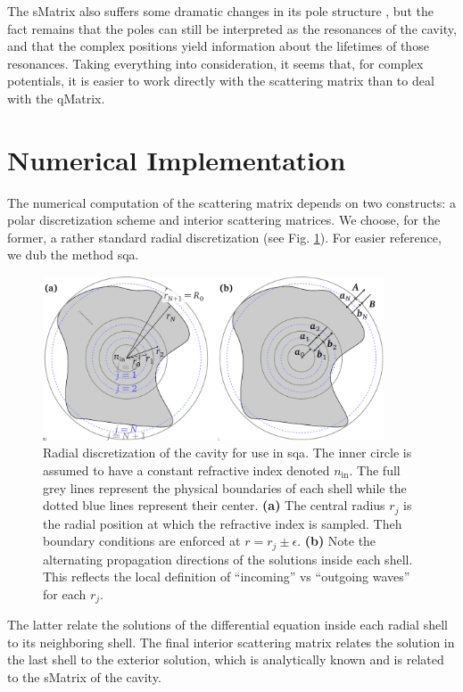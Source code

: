 The \gls{sMatrix} also suffers some dramatic changes in its pole structure
\cite{JOF1973,KOK1981}, but the fact remains that the poles can still be
interpreted as the resonances of the cavity, and that the complex positions
yield information about the lifetimes of those resonances. Taking everything
into consideration, it seems that, for complex potentials, it is easier to 
work directly with the scattering matrix than to deal with the \gls{qMatrix}.

\section{Numerical Implementation}
The numerical computation of the scattering matrix 
depends on two constructs: a polar discretization 
scheme and interior scattering matrices. We choose, for
the former, a rather standard radial discretization 
(see Fig. \ref{fig:passive.numerical.radialDiscretization}).
For easier reference, we dub the method \gls{sqa}.

\begin{figure}
 \centering
 \includegraphics[width=0.9\textwidth]{figs/passive/figDisScatCoeff.pdf}
 \caption[Radial discretization for use in SQA]
	 {Radial discretization of the cavity for use in \gls{sqa}. The inner circle is assumed to 
	 have a constant refractive index denoted $n_\text{in}$. The full grey lines represent
	 the physical boundaries of each shell while the dotted blue lines represent their
	 center. \textbf{(a)} The central radius $r_j$ is the radial position at which the 
	 refractive index is sampled. Theh boundary conditions are enforced at $r=r_j\pm\epsilon$.
	 \textbf{(b)} Note the alternating propagation directions of the solutions inside each shell.
	 This reflects the local definition of ``incoming'' vs ``outgoing waves'' for each $r_j$.}
  \label{fig:passive.numerical.radialDiscretization}
\end{figure}

The latter relate the solutions of the differential equation 
inside each radial shell to its neighboring shell. The final
interior scattering matrix relates the solution in the last shell
to the exterior solution, which is analytically known and is 
related to the \gls{sMatrix} of the cavity.

